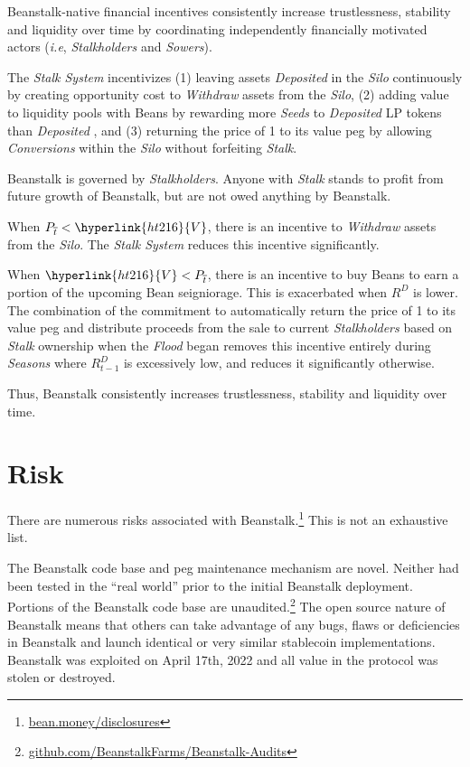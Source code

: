 \documentclass[tikz]{article}
\newcommand{\term}[1]{\textsl{#1}}
\newcommand{\fref}[1]{\footnote{\href{http://#1}{#1}}}
\newcommand{\Bean}{} %
\begin{document}
Beanstalk-native financial incentives consistently increase trustlessness, stability and liquidity over time by coordinating independently financially motivated actors (\term{i.e}, \term{Stalkholders} and \term{Sowers}). 

The \term{Stalk System} incentivizes (1) leaving assets \term{Deposited} in the \term{Silo} continuously by creating opportunity cost to \term{Withdraw} assets from the \term{Silo}, (2) adding value to liquidity pools with Beans by rewarding more \term{Seeds} to \term{Deposited} LP tokens than \term{Deposited} \Bean, and (3) returning the price of \Bean1 to its value peg by allowing \term{Conversions} within the \term{Silo} without forfeiting \term{Stalk}.

Beanstalk is governed by \term{Stalkholders}. Anyone with \term{Stalk} stands to profit from future growth of Beanstalk, but are not owed anything by Beanstalk. 

When $P_{\overline{t}} < \hyperlink{ht216}{V}$, there is an incentive to \term{Withdraw} assets from the \term{Silo}. The \term{Stalk System} reduces this incentive significantly.

When $\hyperlink{ht216}{V} < P_{\overline{t}}$, there is an incentive to buy Beans to earn a portion of the upcoming Bean seigniorage. This is exacerbated when \hyperlink{ht156}{$R^D$} is lower. The combination of the commitment to automatically return the price of \Bean1 to its value peg and distribute proceeds from the sale to current \term{Stalkholders} based on \term{Stalk} ownership when the \term{Flood} began removes this incentive entirely during \term{Seasons} where \hyperlink{ht157}{$R^D_{t-1}$} is excessively low, and reduces it significantly otherwise.

Thus, Beanstalk consistently increases trustlessness, stability and liquidity over time.


\section{Risk}

There are numerous risks associated with Beanstalk.\fref{bean.money/disclosures} This is not an exhaustive list.

The Beanstalk code base and peg maintenance mechanism are novel. Neither had been tested in the “real world” prior to the initial Beanstalk deployment. Portions of the Beanstalk code base are unaudited.\footnote{\href{https://github.com/BeanstalkFarms/Beanstalk-Audits}{github.com/BeanstalkFarms/Beanstalk-Audits}} The open source nature of Beanstalk means that others can take advantage of any bugs, flaws or deficiencies in Beanstalk and launch identical or very similar stablecoin implementations. Beanstalk was exploited on April 17th, 2022 and all value in the protocol was stolen or destroyed.
\end{document}
